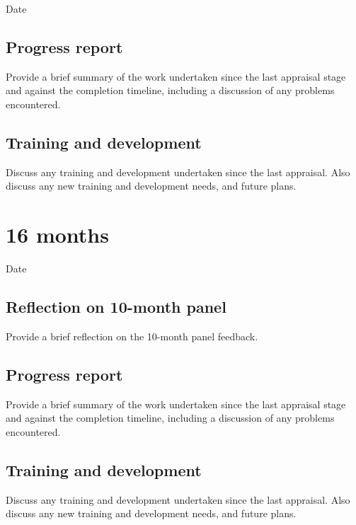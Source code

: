 \documentclass[12pt,a4paper]{article}
\begin{document}
\begin{description}
	\item[Date] %
\end{description}

\subsection{Progress report}
Provide a brief summary of the work undertaken since the last appraisal stage and against the completion timeline, including a discussion of any problems encountered. %

\subsection{Training and development}
Discuss any training and development undertaken since the last appraisal. Also discuss any new training and development needs, and future plans. %


\section{16 months}

\begin{description}
	\item[Date] %
\end{description}

\subsection{Reflection on 10-month panel}
Provide a brief reflection on the 10-month panel feedback. %

\subsection{Progress report}
Provide a brief summary of the work undertaken since the last appraisal stage and against the completion timeline, including a discussion of any problems encountered. %

\subsection{Training and development}
Discuss any training and development undertaken since the last appraisal. Also discuss any new training and development needs, and future plans. %
\end{document}
